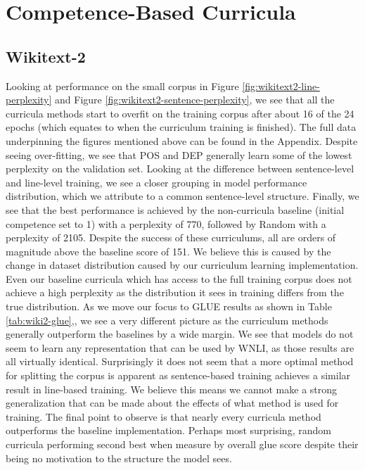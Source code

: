 \section{Competence-Based Curricula}
\subsection{Wikitext-2}
Looking at performance on the small corpus in Figure \ref{fig:wikitext2-line-perplexity} and Figure \ref{fig:wikitext2-sentence-perplexity}, we see that all the curricula methods start to overfit on the training corpus after about 16 of the 24 epochs (which equates to when the curriculum training is finished). The full data underpinning the figures mentioned above can be found in the Appendix. Despite seeing over-fitting, we see that POS and DEP generally learn some of the lowest perplexity on the validation set. Looking at the difference between sentence-level and line-level training, we see a closer grouping in model performance distribution, which we attribute to a common sentence-level structure. Finally, we see that the best performance is achieved by the non-curricula baseline (initial competence set to 1) with a perplexity of 770, followed by Random with a perplexity of 2105. Despite the success of these curriculums, all are orders of magnitude above the baseline score of 151. We believe this is caused by the change in dataset distribution caused by our curriculum learning implementation. Even our baseline curricula which has access to the full training corpus does not achieve a high perplexity as the distribution it sees in training differs from the true distribution. 
As we move our focus to GLUE results as shown in Table \ref{tab:wiki2-glue},, we see a very different picture as the curriculum methods generally outperform the baselines by a wide margin. We see that models do not seem to learn any representation that can be used by WNLI, as those results are all virtually identical. Surprisingly it does not seem that a more optimal method for splitting the corpus is apparent as sentence-based training achieves a similar result in line-based training. We believe this means we cannot make a strong generalization that can be made about the effects of what method is used for training. The final point to observe is that nearly every curricula method outperforms the baseline implementation. Perhaps most surprising, random curricula performing second best when measure by overall glue score despite their being no motivation to the structure the model sees. \\
